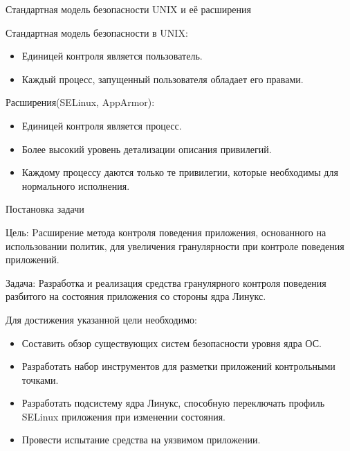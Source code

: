 \documentclass{beamer}
\begin{document}
\begin{frame}{Стандартная модель безопасности UNIX и её расширения}

\begin{block}{Стандартная модель безопасности в UNIX:}
\begin{itemize}
\item Единицей контроля является пользователь.
\item Каждый процесс, запущенный пользователя обладает его правами.
\end{itemize}
\end{block}

\begin{block}{Расширения(SELinux, AppArmor):}
\begin{itemize}
\item Единицей контроля является процесс.
\item Более высокий уровень детализации описания привилегий.
\item Каждому процессу даются только те привилегии, которые необходимы для нормального исполнения.
\end{itemize}
\end{block}
\end{frame}

\begin{frame}{Постановка задачи}
 \begin{block}{Цель:}
  \small{Pасширение метода контроля поведения приложения, основанного на использовании политик, для увеличения гранулярности при контроле поведения приложений.}
 \end{block}
\begin{block}{Задача:}
\small{Разработка и реализация средства гранулярного контроля
        поведения разбитого на состояния приложения со стороны
        ядра Линукс.}
 \end{block}
 \begin{block}{Для достижения указанной цели необходимо:}
  \begin{itemize}
   \item \small{Составить обзор существующих систем безопасности уровня ядра ОС.}
   \item \small{Разработать набор инструментов для разметки
        приложений контрольными точками.}
   \item \small{Разработать подсистему ядра Линукс, способную
        переключать профиль SELinux приложения при изменении состояния.}
   \item \small{Провести испытание средства на уязвимом приложении.}
  \end{itemize}
 \end{block}
\end{frame}
\end{document}
